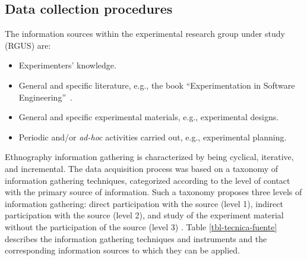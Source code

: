 \subsection{Data collection procedures}\label{subsec-data-collection}

The information sources within the experimental research group under study (RGUS) are:

\begin{itemize}

	\item Experimenters' knowledge.
	
	\item General and specific literature, e.g., the book \textquotedblleft Experimentation in Software Engineering\textquotedblright~\cite{Wohlin-2012-experimentatio-SE}.
	
	\item General and specific experimental materials, e.g., experimental designs.
	
	\item Periodic and/or \textit{ad-hoc} activities carried out, e.g., experimental planning.
	
\end{itemize}

Ethnography information gathering is characterized by being cyclical, iterative, and incremental. The data acquisition process was based on a taxonomy of information gathering techniques, categorized according to the level of contact with the primary source of information. Such a taxonomy proposes three levels of information gathering: direct participation with the source (level 1), indirect participation with the source (level 2), and study of the experiment material without the participation of the source (level 3) \cite{Lethbridge-2005-data-collection-techniques-SE}. Table \ref{tbl-tecnica-fuente} describes the information gathering techniques and instruments and the corresponding information sources to which they can be applied.

